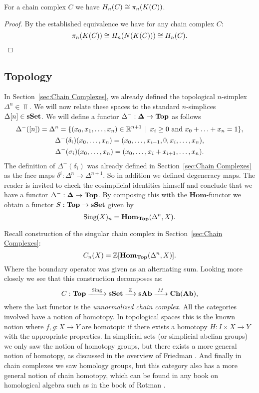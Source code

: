 \begin{corollary}
	For a chain complex $C$ we have $H_n(C) \cong \pi_n(K(C))$.
\end{corollary}
\begin{proof}
	By the established equivalence we have for any chain complex $C$:
	$$ \pi_n(K(C)) \cong H_n(N(K(C))) \cong H_n(C). $$
\end{proof}

\subsection{Topology}
In Section~\ref{sec:Chain Complexes}, we already defined the topological $n$-simplex $\Delta^n \in \Top$. We will now relate these spaces to the standard $n$-simplices $\Delta[n] \in \mathbf{sSet}$. We will define a functor $\Delta^-: \mathbf{\Delta} \to \mathbf{Top}$ as follows
\begin{gather*}
	\Delta^-([n]) = \Delta^n = \{(x_0, x_1, \ldots, x_n) \in \mathbb{R}^{n+1} \,\mid\, x_i \geq 0 \text{ and } x_0 + \ldots + x_n = 1 \}, \\
	\Delta^-(\delta_i) (x_0, \ldots, x_n) = (x_0, \ldots, x_{i-1}, 0, x_{i}, \ldots, x_n), \\
	\Delta^-(\sigma_i) (x_0, \ldots, x_n) = (x_0, \ldots, x_{i} + x_{i+1}, \ldots, x_n).
\end{gather*}
The definition of $\Delta^-(\delta_i)$ was already defined in Section~\ref{sec:Chain Complexes} as the face maps $\delta^i: \Delta^n \to \Delta^{n+1}$. So in addition we defined degeneracy maps. The reader is invited to check the cosimplicial identities himself and conclude that we have a functor $\Delta^-: \mathbf{\Delta} \to \mathbf{Top}$. By composing this with the $\mathbf{Hom}$-functor we obtain a functor $S: \mathbf{Top} \to \mathbf{sSet}$ given by
$$ \text{Sing}(X)_n = \mathbf{Hom}_{\mathbf{Top}}(\Delta^n, X). $$

Recall construction of the singular chain complex in Section~\ref{sec:Chain Complexes}:
$$ C_n(X) = \mathbb{Z}[\mathbf{Hom}_{\mathbf{Top}}(\Delta^n, X)]. $$
Where the boundary operator was given as an alternating sum. Looking more closely we see that this construction decomposes as:
$$ C: \mathbf{Top} \xrightarrow{\,\,{\text{Sing}}\,\,} \mathbf{sSet} \xrightarrow{\,\,{\mathbb{Z}}\,\,} \mathbf{sAb} \xrightarrow{\,\,{M}\,\,} \mathbf{Ch}(\mathbf{Ab}), $$
where the last functor is the \emph{unnormalized chain complex}. All the categories involved have a notion of homotopy. In topological spaces this is the known notion where $f, g:X \to Y$ are homotopic if there exists a homotopy $H:I \times X \to Y$ with the appropriate properties. In simplicial sets (or simplicial abelian groups) we only saw the notion of homotopy groups, but there exists a more general notion of homotopy, as discussed in the overview of Friedman \cite{friedman}. And finally in chain complexes we saw homology groups, but this category also has a more general notion of chain homotopy, which can be found in any book on homological algebra such as in the book of Rotman \cite{rotman}.

